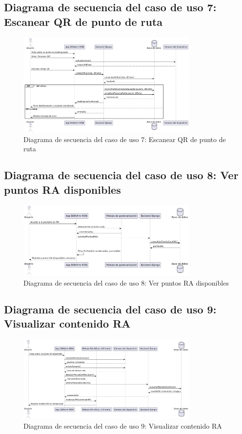 \subsection{Diagrama de secuencia del caso de uso 7: Escanear QR de punto de ruta}
\begin{figure}[H]
    \centering
    \includegraphics[width=0.8\textwidth]{figs/caso7.png}
    \caption{Diagrama de secuencia del caso de uso 7: Escanear QR de punto de ruta}
\end{figure}

\subsection{Diagrama de secuencia del caso de uso 8: Ver puntos RA disponibles}
\begin{figure}[H]
    \centering
    \includegraphics[width=0.8\textwidth]{figs/caso8.png}
    \caption{Diagrama de secuencia del caso de uso 8: Ver puntos RA disponibles}
\end{figure}

\subsection{Diagrama de secuencia del caso de uso 9: Visualizar contenido RA}
\begin{figure}[H]
    \centering
    \includegraphics[width=0.8\textwidth]{figs/caso9.png}
    \caption{Diagrama de secuencia del caso de uso 9: Visualizar contenido RA}
\end{figure}


